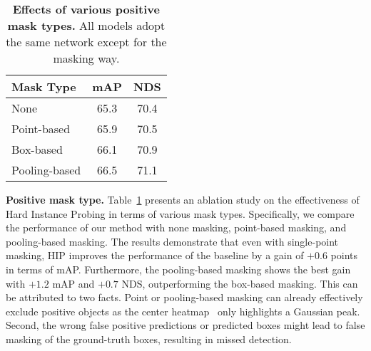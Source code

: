 \documentclass[10pt,twocolumn,letterpaper]{article}
\begin{document}
\begin{table}[bpt]
	\begin{center}
		\begin{tabular}{lcc}
			\toprule
			  Mask Type & mAP & NDS \\ \midrule
                None  & 65.3 & 70.4 \\ \midrule
Point-based & 65.9 & 70.5 \\
                Box-based & 66.1 & 70.9 \\ 
                Pooling-based & 66.5 & 71.1 \\
			\bottomrule
		\end{tabular}
	\end{center}
	\caption{\textbf{Effects of various positive mask types.} All models adopt the same network except for the masking way.} \label{tab: whether apply mask}
\end{table}

\vspace{2mm}
\noindent\textbf{Positive mask type.}
Table~\ref{tab: whether apply mask} presents an ablation study on the effectiveness of Hard Instance Probing in terms of various mask types. Specifically, we compare the performance of our method with none masking, point-based masking, and pooling-based masking. The results demonstrate that even with single-point masking, HIP improves the performance of the baseline by a gain of $+0.6$ points in terms of mAP. Furthermore, the pooling-based masking shows the best gain with $+1.2$ mAP and $+0.7$ NDS, outperforming the box-based masking. This can be attributed to two facts. Point or pooling-based masking can already effectively exclude positive objects as the center heatmap~\cite{centerpoint} only highlights a Gaussian peak. Second, the wrong false positive predictions or predicted boxes might lead to false masking of the ground-truth boxes, resulting in missed detection.
\end{document}
